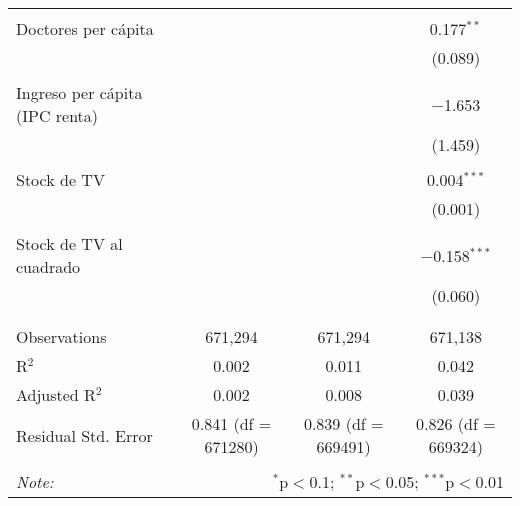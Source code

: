 \begin{table}[!htbp]
\begin{tabular}{@{\extracolsep{5pt}}lccc}
  & & & \\ 
 Doctores per cápita &  &  & 0.177$^{**}$ \\ 
  &  &  & (0.089) \\ 
  & & & \\ 
 Ingreso per cápita (IPC renta) &  &  & $-$1.653 \\ 
  &  &  & (1.459) \\ 
  & & & \\ 
 Stock de TV &  &  & 0.004$^{***}$ \\ 
  &  &  & (0.001) \\ 
  & & & \\ 
 Stock de TV al cuadrado &  &  & $-$0.158$^{***}$ \\ 
  &  &  & (0.060) \\ 
  & & & \\ 
\hline \\[-1.8ex] 
Observations & 671,294 & 671,294 & 671,138 \\ 
R$^{2}$ & 0.002 & 0.011 & 0.042 \\ 
Adjusted R$^{2}$ & 0.002 & 0.008 & 0.039 \\ 
Residual Std. Error & 0.841 (df = 671280) & 0.839 (df = 669491) & 0.826 (df = 669324) \\ 
\hline 
\hline \\[-1.8ex] 
\textit{Note:}  & \multicolumn{3}{r}{$^{*}$p$<$0.1; $^{**}$p$<$0.05; $^{***}$p$<$0.01} \\ 
\end{tabular} 
\end{table} 
